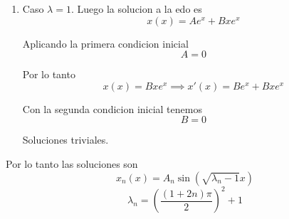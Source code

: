 \documentclass[../main.tex]{subfiles}
\begin{document}
\begin{solution}
\begin{enumerate}
      \item Caso $\lambda = 1$. Luego la solucion a la edo es
            \begin{equation*}
              x(x) = Ae^{x} + Bxe^{x}
            \end{equation*}

            Aplicando la primera condicion inicial
            \begin{equation*}
              A = 0
            \end{equation*}

            Por lo tanto
            \begin{equation*}
              x(x) = Bxe^{x} \implies x'(x) = Be^{x} + Bxe^{x}
            \end{equation*}

            Con la segunda condicion inicial tenemos
            \begin{equation*}
              B = 0
            \end{equation*}

            Soluciones triviales.
    \end{enumerate}

    Por lo tanto las soluciones son
    \begin{equation*}
      x_{n}(x) = A_{n}\sin(\sqrt{\lambda_{n} - 1}x)
    \end{equation*}
    \begin{equation*}
      \lambda_{n} = (\frac{(1 + 2n)\pi}{2})^{2} + 1
    \end{equation*}

\end{solution}
\end{document}
